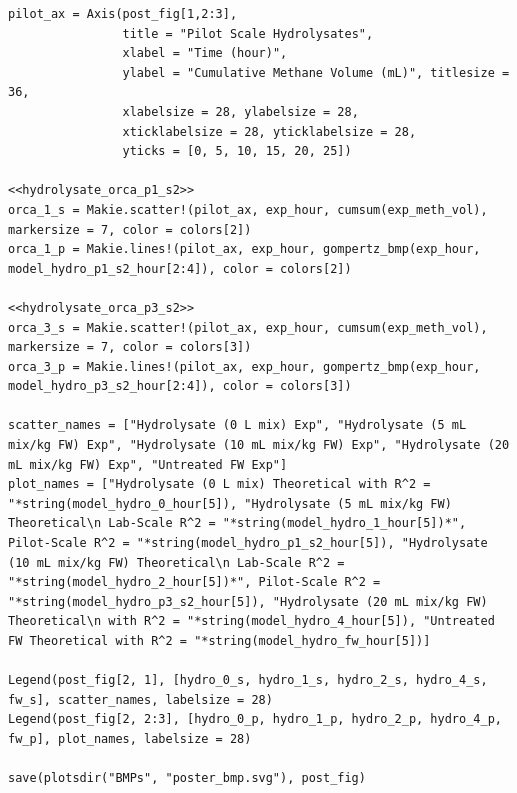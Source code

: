 \documentclass[11pt]{article}
\begin{document}
\begin{verbatim}
pilot_ax = Axis(post_fig[1,2:3],
                title = "Pilot Scale Hydrolysates",
                xlabel = "Time (hour)",
                ylabel = "Cumulative Methane Volume (mL)", titlesize = 36,
                xlabelsize = 28, ylabelsize = 28,
                xticklabelsize = 28, yticklabelsize = 28,
                yticks = [0, 5, 10, 15, 20, 25])

<<hydrolysate_orca_p1_s2>>
orca_1_s = Makie.scatter!(pilot_ax, exp_hour, cumsum(exp_meth_vol), markersize = 7, color = colors[2])
orca_1_p = Makie.lines!(pilot_ax, exp_hour, gompertz_bmp(exp_hour, model_hydro_p1_s2_hour[2:4]), color = colors[2])

<<hydrolysate_orca_p3_s2>>
orca_3_s = Makie.scatter!(pilot_ax, exp_hour, cumsum(exp_meth_vol), markersize = 7, color = colors[3])
orca_3_p = Makie.lines!(pilot_ax, exp_hour, gompertz_bmp(exp_hour, model_hydro_p3_s2_hour[2:4]), color = colors[3])

scatter_names = ["Hydrolysate (0 L mix) Exp", "Hydrolysate (5 mL mix/kg FW) Exp", "Hydrolysate (10 mL mix/kg FW) Exp", "Hydrolysate (20 mL mix/kg FW) Exp", "Untreated FW Exp"]
plot_names = ["Hydrolysate (0 L mix) Theoretical with R^2 = "*string(model_hydro_0_hour[5]), "Hydrolysate (5 mL mix/kg FW) Theoretical\n Lab-Scale R^2 = "*string(model_hydro_1_hour[5])*", Pilot-Scale R^2 = "*string(model_hydro_p1_s2_hour[5]), "Hydrolysate (10 mL mix/kg FW) Theoretical\n Lab-Scale R^2 = "*string(model_hydro_2_hour[5])*", Pilot-Scale R^2 = "*string(model_hydro_p3_s2_hour[5]), "Hydrolysate (20 mL mix/kg FW) Theoretical\n with R^2 = "*string(model_hydro_4_hour[5]), "Untreated FW Theoretical with R^2 = "*string(model_hydro_fw_hour[5])]

Legend(post_fig[2, 1], [hydro_0_s, hydro_1_s, hydro_2_s, hydro_4_s, fw_s], scatter_names, labelsize = 28)
Legend(post_fig[2, 2:3], [hydro_0_p, hydro_1_p, hydro_2_p, hydro_4_p, fw_p], plot_names, labelsize = 28)

save(plotsdir("BMPs", "poster_bmp.svg"), post_fig)

\end{verbatim}
\end{document}
